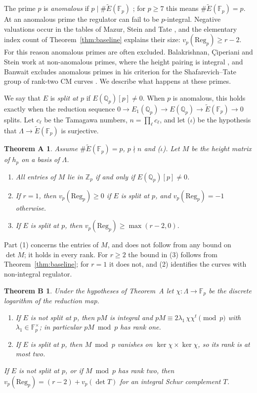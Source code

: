 \documentclass[11pt,a4paper]{amsart}
\newcommand{\Qp}{\mathbb{Q}_p}
\newcommand{\Zp}{\mathbb{Z}_p}
\newcommand{\Fp}{\mathbb{F}_p}
\newcommand{\Reg}{\mathrm{Reg}}
\newcommand{\Et}{\widetilde{E}}
\newcommand{\Lam}{\Lambda}
\theoremstyle{plain}
\newtheorem*{theoremA}{Theorem A}
\newtheorem*{theoremB}{Theorem B}
\theoremstyle{definition}
\theoremstyle{remark}
\begin{document}
The prime $p$ is \emph{anomalous} if $p\mid\#\Et(\Fp)$ \cite{Maz72}; for $p\ge7$ this means $\#\Et(\Fp)=p$. At an anomalous prime the regulator can fail to be $p$-integral. Negative valuations occur in the tables of Mazur, Stein and Tate \cite[\S4]{MST}, and the elementary index count of Theorem~\ref{thm:baseline} explains their size: $v_p(\Reg_p)\ge r-2$. For this reason anomalous primes are often excluded. Balakrishnan, \c{C}iperiani and Stein work at non-anomalous primes, where the height pairing is integral \cite{BCS}, and Banwait excludes anomalous primes in his criterion for the Shafarevich--Tate group of rank-two CM curves \cite{Ban}. We describe what happens at these primes.

We say that $E$ is \emph{split at $p$} if $E(\Qp)[p]\ne0$. When $p$ is anomalous, this holds exactly when the reduction sequence $0\to E_1(\Qp)\to E(\Qp)\to\Et(\Fp)\to0$ splits. Let $c_\ell$ be the Tamagawa numbers, $n=\prod_\ell c_\ell$, and let ($\iota$) be the hypothesis that $\Lam\to\Et(\Fp)$ is surjective.

\begin{theoremA}
Assume $\#\Et(\Fp)=p$, $p\nmid n$ and \textup{($\iota$)}. Let $M$ be the height matrix of $h_p$ on a basis of $\Lam$.
\begin{enumerate}[label=\textup{(\arabic*)}]
\item All entries of $M$ lie in $\Zp$ if and only if $E(\Qp)[p]\ne0$.
\item If $r=1$, then $v_p(\Reg_p)\ge0$ if $E$ is split at $p$, and $v_p(\Reg_p)=-1$ otherwise.
\item If $E$ is split at $p$, then $v_p(\Reg_p)\ge\max(r-2,0)$.
\end{enumerate}
\end{theoremA}

Part (1) concerns the entries of $M$, and does not follow from any bound on $\det M$; it holds in every rank. For $r\ge2$ the bound in (3) follows from Theorem~\ref{thm:baseline}; for $r=1$ it does not, and (2) identifies the curves with non-integral regulator.

\begin{theoremB}
Under the hypotheses of Theorem~A let $\chi\colon\Lam\to\Fp$ be the discrete logarithm of the reduction map.
\begin{enumerate}[label=\textup{(\arabic*)}]
\item If $E$ is not split at $p$, then $pM$ is integral and $pM\equiv2\lambda_1\,\chi\chi^{t}\pmod p$ with $\lambda_1\in\Fp^\times$; in particular $pM\bmod p$ has rank one.
\item If $E$ is split at $p$, then $M\bmod p$ vanishes on $\ker\chi\times\ker\chi$, so its rank is at most two.
\end{enumerate}
If $E$ is not split at $p$, or if $M\bmod p$ has rank two, then $v_p(\Reg_p)=(r-2)+v_p(\det T)$ for an integral Schur complement $T$.
\end{theoremB}
\end{document}
